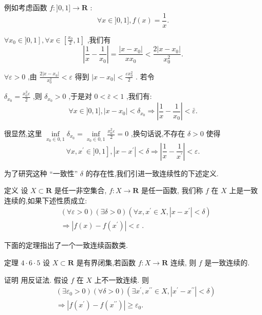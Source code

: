 例如考虑函数 $f : \rbrack 0,1\rbrack  \rightarrow  \mathbf{R}$ :
$$\forall x \in  \rbrack 0,1\rbrack ,f\left( x\right)  = \frac{1}{x}.$$

$\left. {\forall {x}_{0} \in  \rbrack 0,1}\right\rbrack  ,\forall x \in  \left\lbrack  {\frac{{x}_{0}}{2},1}\right\rbrack$ ,我们有
$$\left| {\frac{1}{x} - \frac{1}{{x}_{0}}}\right|  = \frac{\left| x - {x}_{0}\right| }{x{x}_{0}} < \frac{2\left| {x - {x}_{0}}\right| }{{x}_{0}^{2}}.$$

$\forall \varepsilon  > 0$ ,由 $\frac{2\left| {x - {x}_{0}}\right| }{{x}_{0}^{2}} < \varepsilon$ 得到 $\left| {x - {x}_{0}}\right|  < \frac{\varepsilon {x}_{0}^{2}}{2}$ . 若令

${\delta }_{{x}_{0}} = \frac{{x}_{0}^{2}\varepsilon }{2}$ ,则 ${\delta }_{{x}_{0}} > 0$ ,于是对 $0 < \bar{\varepsilon } < 1$ ,我们有:
$$\forall x \in  \rbrack 0,1\rbrack ,\left| {x - {x}_{0}}\right|  < {\delta }_{{x}_{0}} \Rightarrow  \left| {\frac{1}{x} - \frac{1}{{x}_{0}}}\right|  < \bar{\varepsilon }.$$

很显然,这里 $\mathop{\inf }\limits_{{{x}_{0} \in  0,1}}{\delta }_{{x}_{0}} = \mathop{\inf }\limits_{{{x}_{0} \in  0,1}}\frac{{x}_{0}^{2}\varepsilon }{2} = 0$ ,换句话说,不存在 $\delta  > 0$ 使得
$$\left. {\forall x,{x}^{\prime } \in  \rbrack 0,1}\right\rbrack  ,\left| {x - {x}^{\prime }}\right|  < \delta  \Rightarrow  \left| {\frac{1}{x} - \frac{1}{{x}^{\prime }}}\right|  < \varepsilon .$$

为了研究这种 “一致性” $\delta$ 的存在性,我们引进一致连续性的下述定义.

定义 设 $X \subset  \mathbf{R}$ 是任一非空集合, $f : X \rightarrow  \mathbf{R}$ 是任一函数, 我们称 $f$ 在 $X$ 上是一致连续的,如果下述性质成立:
\begin{align*}
	&\left( {\forall \varepsilon  > 0}\right) \left( {\exists \delta  > 0}\right) \left( {\forall x,{x}^{\prime } \in  X,\left| {x - {x}^{\prime }}\right|  < \delta }\right)\\
	&\Rightarrow  \left| {f\left( x\right)  - f\left( {x}^{\prime }\right) }\right|  < \varepsilon \text{ . }
\end{align*}

下面的定理指出了一个一致连续函数类.

定理 $4 \cdot  6 \cdot  5$ 设 $X \subset  \mathbf{R}$ 是有界闭集,若函数 $f : X \rightarrow  \mathbf{R}$ 连续, 则 $f$ 是一致连续的.

证明 用反证法. 假设 $f$ 在 $X$ 上不一致连续. 则
\begin{align*}
	&\left( {\exists {\varepsilon }_{0} > 0}\right) \left( {\forall \delta  > 0}\right) \left( {\exists {x}^{\prime },{x}^{\prime \prime } \in  X,\left| {{x}^{\prime } - {x}^{\prime \prime }}\right|  < \delta }\right)\\
	&\Rightarrow  \left| {f\left( {x}^{\prime }\right)  - f\left( {x}^{\prime \prime }\right) }\right|  \geq  {\varepsilon }_{0}.
\end{align*}

